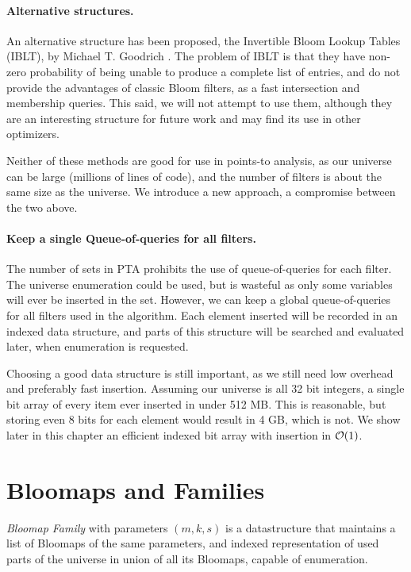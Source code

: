 \paragraph{Alternative structures.} An alternative structure has been proposed,
the Invertible Bloom
Lookup Tables (IBLT), by Michael T. Goodrich \cite{goodrich:2011}. The problem of IBLT is
that they have non-zero probability of being unable to produce a complete list
of entries, and do not provide the advantages of classic Bloom filters, as a
fast intersection and membership queries. This said, we will not attempt to use
them, although they are an interesting structure for future work and may find
its use in other optimizers.

Neither of these methods are good for use in points-to analysis, as our universe
can be large (millions of lines of code), and the number of filters is about the
same size as the universe. We introduce a new approach, a compromise between the
two above.

\paragraph{Keep a single Queue-of-queries for all filters.} The number of sets
in PTA prohibits the use of queue-of-queries for each filter. The universe
enumeration could be used, but is wasteful as only some variables will ever be
inserted in the set. However, we can keep a global queue-of-queries for all
filters used in the algorithm. Each element inserted will be recorded in an
indexed data structure, and parts of this structure will be searched and
evaluated later, when enumeration is requested.

Choosing a good data structure is still important, as we still need low overhead
and preferably fast insertion. Assuming our universe is all 32 bit integers, a
single bit array of every item ever inserted in under 512 MB. This is
reasonable, but storing even 8 bits for each element would result in 4 GB, which
is not. We show later in this chapter an efficient indexed bit array with
insertion in $\mathcal{O}(1)$.


\section{Bloomaps and Families}

{\it Bloomap Family} with parameters $(m, k, s)$ is a datastructure that
maintains a list of Bloomaps of the same parameters, and indexed representation
of used parts of the universe in union of all its Bloomaps, capable of
enumeration.

